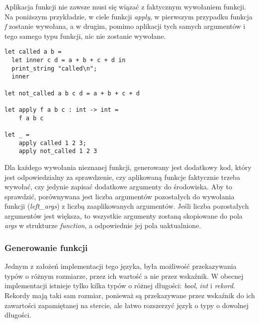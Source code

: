 \documentclass[declaration,shortabstract]{iithesis}
\begin{document}
Aplikacja funkcji nie zawsze musi się wiązać z faktycznym wywołaniem funkcji.
Na poniższym przykładzie, w ciele funkcji \textit{apply},
w pierwszym przypadku funkcja \textit{f} zostanie wywołana, 
a w drugim, pomimo aplikacji tych samych argumentów i tego samego typu funkcji, 
nic nie zostanie wywołane.
\begin{lstlisting}[frame=single, caption={To czy funkcja zostanie wywołana,
nie jest wiadome w czasie kompilacj. OCaml.}]
let called a b = 
  let inner c d = a + b + c + d in 
  print_string "called\n";
  inner 

let not_called a b c d = a + b + c + d 

let apply f a b c : int -> int = 
    f a b c 

let _ = 
    apply called 1 2 3;
    apply not_called 1 2 3
\end{lstlisting}

Dla każdego wywołania nieznanej funkcji, generowany jest dodatkowy \newline
kod, który jest odpowiedzialny za sprawdzenie, czy aplikowaną funkcje 
faktycznie trzeba wywołać, czy jedynie zapisać dodatkowe argumenty do 
środowiska. Aby to sprawdzić, porównywana jest liczba argumentów pozostałych do 
wywołania funkcji (\textit{left\_args}) z liczbą zaaplikowanych argumentów.
Jeśli liczba pozostałych argumentów jest większa, to wszystkie argumenty 
zostaną skopiowane do pola \textit{args} w strukturze \textit{function}, a 
odpowiednie jej pola uaktualnione.










\subsubsection{Generowanie funkcji}

Jednym z założeń implementacji tego języka, była możliwość przekazywania typów
o różnym rozmiarze, przez ich wartość a nie przez wskaźnik. W obecnej 
implementacji istnieje tylko kilka typów o różnej długości: \textit{bool},
\textit{int} i \textit{rekord}. Rekordy mają taki sam rozmiar, ponieważ są 
przekazywane przez wskaźnik do ich zawartości zapamiętanej na stercie, ale 
łatwo rozszerzyć język o typy o dowolnej długości. 
\end{document}
